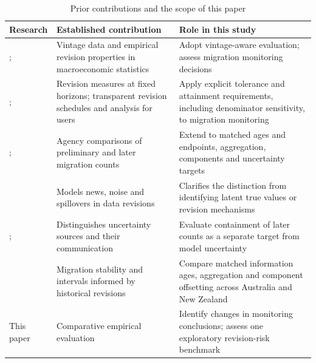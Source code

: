 \begin{table}[htbp]\centering\small
\caption{Prior contributions and the scope of this paper}\label{tab:literature}
\begin{tabularx}{\linewidth}{@{}>{\raggedright\arraybackslash}p{.25\linewidth}>{\raggedright\arraybackslash}X>{\raggedright\arraybackslash}X@{}}\toprule
Research & Established contribution & Role in this study\\\midrule
\citet{croushore2001}; \citet{aruoba2008} & Vintage data and empirical revision properties in macroeconomic statistics & Adopt vintage-aware evaluation; assess migration monitoring decisions\\
\citet{mckenzie2006}; \citet{eurostat2013} & Revision measures at fixed horizons; transparent revision schedules and analysis for users & Apply explicit tolerance and attainment requirements, including denominator sensitivity, to migration monitoring\\
\citet{abs2024}; \citet{statsnzdata} & Agency comparisons of preliminary and later migration counts & Extend to matched ages and endpoints, aggregation, components and uncertainty targets\\
\citet{jacobs2011} & Models news, noise and spillovers in data revisions & Clarifies the distinction from identifying latent true values or revision mechanisms\\
\citet{mazzi2021}; \citet{onsuncertainty} & Distinguishes uncertainty sources and their communication & Evaluate containment of later counts as a separate target from model uncertainty\\
\citet{ons2025} & Migration stability and intervals informed by historical revisions & Compare matched information ages, aggregation and component offsetting across Australia and New Zealand\\
This paper & Comparative empirical evaluation & Identify changes in monitoring conclusions; assess one exploratory revision-risk benchmark\\\bottomrule
\end{tabularx}
\end{table}

